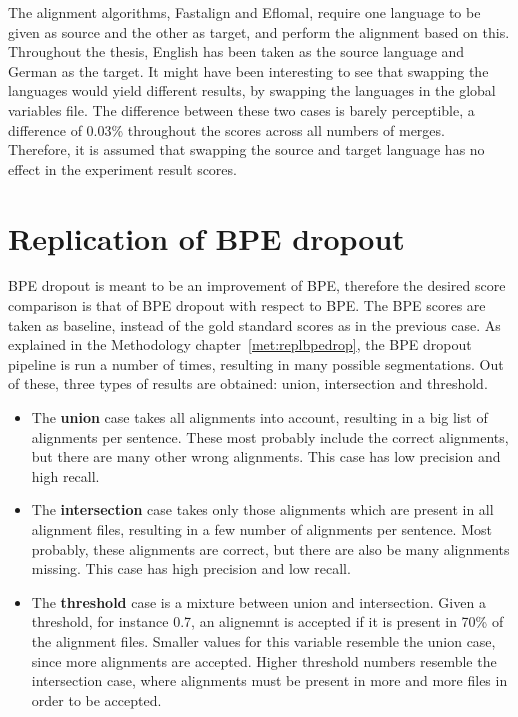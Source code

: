 The alignment algorithms, Fastalign and Eflomal, require one language to be given as source and the other as target, and perform the alignment based on this. Throughout the thesis, English has been taken as the source language and German as the target. It might have been interesting to see that swapping the languages would yield different results, by swapping the languages in the global variables file. The difference between these two cases is barely perceptible, a difference of 0.03\% throughout the scores across all numbers of merges. Therefore, it is assumed that swapping the source and target language has no effect in the experiment result scores.

\section{Replication of BPE dropout}

BPE dropout is meant to be an improvement of BPE, therefore the desired score comparison is that of BPE dropout with respect to BPE. The BPE scores are taken as baseline, instead of the gold standard scores as in the previous case. As explained in the Methodology chapter~\ref{met:replbpedrop}, the BPE dropout pipeline is run a number of times, resulting in many possible segmentations. Out of these, three types of results are obtained: union, intersection and threshold.

\begin{itemize}
	\item The \textbf{union} case takes all alignments into account, resulting in a big list of alignments per sentence. These most probably include the correct alignments, but there are many other wrong alignments. This case has low precision and high recall.
	\item The \textbf{intersection} case takes only those alignments which are present in all alignment files, resulting in a few number of alignments per sentence. Most probably, these alignments are correct, but there are also be many alignments missing. This case has high precision and low recall.
	\item The \textbf{threshold} case is a mixture between union and intersection. Given a threshold, for instance 0.7, an alignemnt is accepted if it is present in 70\% of the alignment files. Smaller values for this variable resemble the union case, since more alignments are accepted. Higher threshold numbers resemble the intersection case, where alignments must be present in more and more files in order to be accepted.
\end{itemize}

